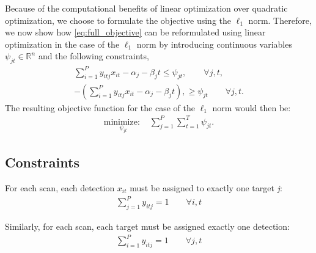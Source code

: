 Because of the computational benefits of linear optimization over quadratic optimization, we choose to formulate the objective using the $\ell_1$ norm. Therefore, we now show how \eqref{eq:full_objective} can be reformulated using linear optimization in the case of the $\ell_1$ norm by introducing continuous variables $\psi_{jt} \in \mathbb{R}^n$ and the following constraints,
\begin{align}
\sum_{i=1}^{P}y_{itj}x_{it} - \alpha_{j} - \beta_{j}t \leq \psi_{jt}, \qquad \forall j,t,\\
-\left(\sum_{i=1}^{P}y_{itj}x_{it} - \alpha_{j} - \beta_{j}t\right), \geq \psi_{jt} \qquad \forall j,t.
\end{align}
The resulting objective function for the case of the $\ell_1$ norm would then be:
\begin{align}
\underset{\psi_{jt}}{\text{minimize: }} & \sum_{j=1}^{P} \sum_{t=1}^{T} \psi_{jt}.
\end{align}


\subsection{Constraints}
For each scan, each detection $x_{it}$ must be assigned to exactly one target \textit{j}:
\begin{align}\label{eq:all_detections}
\sum_{j=1}^{P} y_{itj} = 1 \qquad \forall i,t
\end{align}

Similarly, for each scan, each target must be assigned exactly one detection:
\begin{align}\label{eq:all_targets}
\sum_{i=1}^{P} y_{itj} = 1 \qquad \forall j,t
\end{align}


